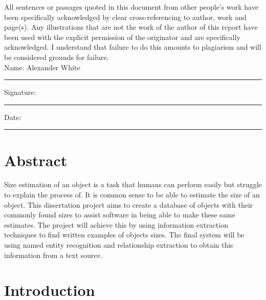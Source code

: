 \documentclass[11pt,oneside]{book}
\begin{document}
All sentences or passages quoted in this document from other people's work have been specifically acknowledged by clear cross-referencing to author, work and page(s).  Any illustrations that are not the work of the author of this report have been used with the explicit permission of the originator and are specifically acknowledged.  I understand that failure to do this amounts to plagiarism and will be considered grounds for failure.\\[1cm]

\noindent Name: Alexander White\\[1mm]
\rule[1em]{25em}{0.5pt}

\noindent Signature:\\[1mm]
\rule[1em]{25em}{0.5pt}

\noindent Date:\\[1mm]
\rule[1em]{25em}{0.5pt}



\chapter*{\Large \center Abstract}

Size estimation of an object is a task that humans can perform easily but struggle to explain the process of. It is common sense to be able to estimate the size of an object. This dissertation project aims to create a database of objects with their commonly found sizes to assist software in being able to make these same estimates. The project will achieve this by using information extraction techniques to find written examples of objects sizes. The final system will be using named entity recognition and relationship extraction to obtain this information from a text source.


\tableofcontents
\listoffigures
\listoftables



\mainmatter

\chapter{Introduction}
\end{document}
